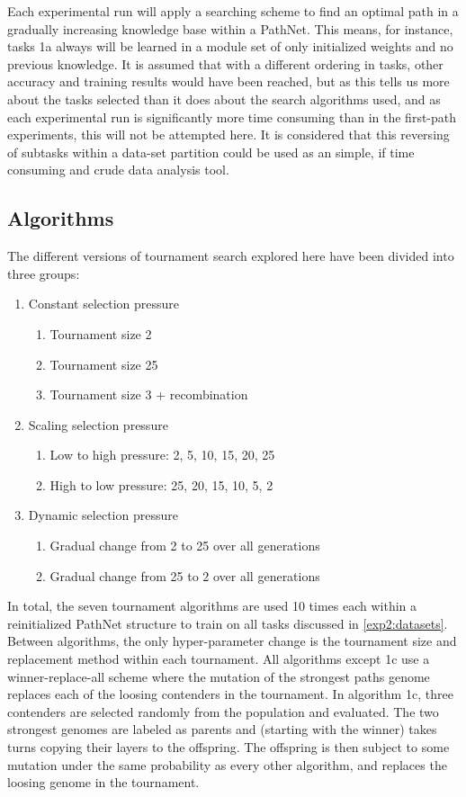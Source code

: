 Each experimental run will apply a searching scheme to find an optimal path in a gradually increasing knowledge base within a PathNet. This means, for instance, tasks 1a always will be learned in a module set of only initialized weights and no previous knowledge. It is assumed that with a different ordering in tasks, other  accuracy and training results would have been reached, but as this tells us more about the tasks selected than it does about the search algorithms used, and as each experimental run is significantly more time consuming than in the first-path experiments, this will not be attempted here. It is considered that this reversing of subtasks within a data-set partition could be used as an simple, if time consuming and crude data analysis tool.

\subsection{Algorithms}\label{exp2:algorithms}
The different versions of tournament search explored here have been divided into three groups: 
\begin{enumerate}
    \item Constant selection pressure
    \begin{enumerate}
        \item Tournament size 2
        \item Tournament size 25
        \item Tournament size 3 + recombination
    \end{enumerate}
    \item Scaling selection pressure
    \begin{enumerate}
        \item Low to high pressure: 2, 5, 10, 15, 20, 25
        \item High to low pressure: 25, 20, 15, 10, 5, 2
    \end{enumerate}
    \item Dynamic selection pressure
    \begin{enumerate}
        \item Gradual change from 2 to 25 over all generations
        \item Gradual change from 25 to 2 over all generations
    \end{enumerate}
\end{enumerate}
In total, the seven tournament algorithms are used 10 times each within a reinitialized PathNet structure to train on all tasks discussed in \ref{exp2:datasets}. Between algorithms, the only hyper-parameter change is the tournament size and replacement method within each tournament. All algorithms except 1c use a winner-replace-all scheme where the mutation of the strongest paths genome replaces each of the loosing contenders in the tournament. In algorithm 1c, three contenders are selected randomly from the population and evaluated. The two strongest genomes are labeled as parents and (starting with the winner) takes turns copying their layers to the offspring. The offspring is then subject to some mutation under the same probability as every other algorithm, and replaces the loosing genome in the tournament.

